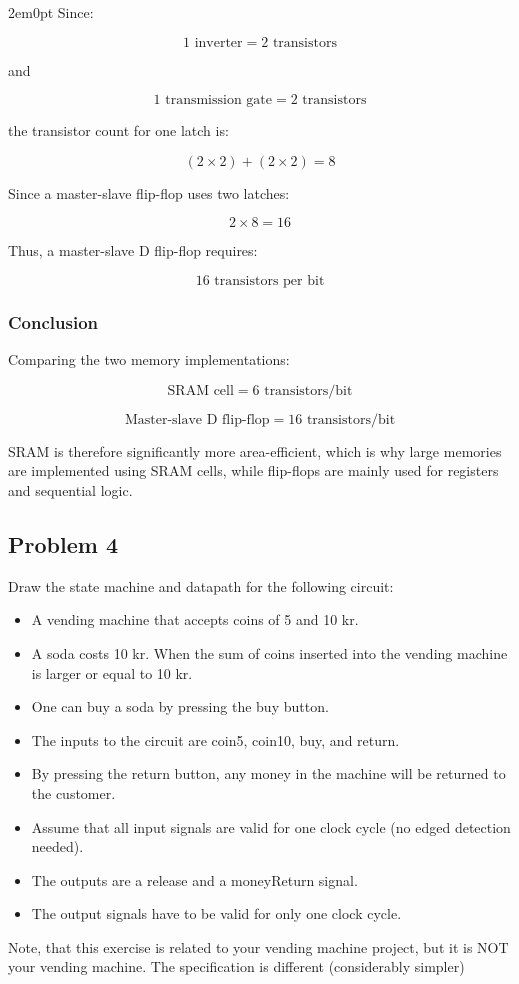 \documentclass[main.tex]{subfiles}
\begin{document}
\begin{adjustwidth}{2em}{0pt}
    Since:
    
    \[
    1 \text{ inverter} = 2 \text{ transistors}
    \]
    
    and
    
    \[
    1 \text{ transmission gate} = 2 \text{ transistors}
    \]
    
    the transistor count for one latch is:
    
    \[
    (2 \times 2) + (2 \times 2) = 8
    \]
    
    Since a master-slave flip-flop uses two latches:
    
    \[
    2 \times 8 = 16
    \]
    
    Thus, a master-slave D flip-flop requires:
    
    \[
    \boxed{16 \text{ transistors per bit}}
    \]
    
    \subsubsection*{Conclusion}
    
    Comparing the two memory implementations:
    
    \[
    \text{SRAM cell} = 6 \text{ transistors/bit}
    \]
    
    \[
    \text{Master-slave D flip-flop} = 16 \text{ transistors/bit}
    \]
    
    SRAM is therefore significantly more area-efficient, which is why large memories are implemented using SRAM cells, while flip-flops are mainly used for registers and sequential logic.
\end{adjustwidth}

\newpage
\subsection{Problem 4}
Draw the state machine and datapath for the following circuit:
\begin{itemize}
    \item A vending machine that accepts coins of 5 and 10 kr.
    \item A soda costs 10 kr. When the sum of coins inserted into the vending machine is larger or equal to 10 kr.
    \item One can buy a soda by pressing the buy button.
    \item The inputs to the circuit are coin5, coin10, buy, and return. 
    \item By pressing the return button, any money in the machine will be returned to the customer.
    \item Assume that all input signals are valid for one clock cycle (no edged detection needed).
    \item The outputs are a release and a moneyReturn signal.
    \item The output signals have to be valid for only one clock cycle.
\end{itemize}
Note, that this exercise is related to your vending machine project, but it is NOT your vending machine. The specification is different (considerably simpler)
\end{document}
